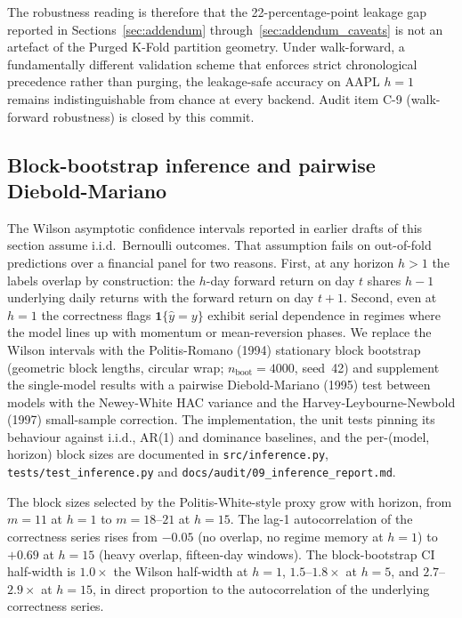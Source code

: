 \documentclass{rQUF2e}
\begin{document}
\noindent The robustness reading is therefore that the
22-percentage-point leakage gap reported in
Sections~\ref{sec:addendum} through~\ref{sec:addendum_caveats}
is not an artefact of the Purged K-Fold partition geometry.
Under walk-forward, a fundamentally different validation scheme
that enforces strict chronological precedence rather than
purging, the leakage-safe accuracy on AAPL $h=1$ remains
indistinguishable from chance at every backend. Audit item C-9
(walk-forward robustness) is closed by this commit.

\subsection{Block-bootstrap inference and pairwise Diebold-Mariano}
\label{sec:addendum_inference}

The Wilson asymptotic confidence intervals reported in earlier
drafts of this section assume i.i.d.\ Bernoulli outcomes. That
assumption fails on out-of-fold predictions over a financial
panel for two reasons. First, at any horizon $h>1$ the labels
overlap by construction: the $h$-day forward return on day $t$
shares $h-1$ underlying daily returns with the forward return on
day $t+1$. Second, even at $h=1$ the correctness flags
$\mathbf{1}\{\hat{y}=y\}$ exhibit serial dependence in regimes
where the model lines up with momentum or mean-reversion phases.
We replace the Wilson intervals with the Politis-Romano (1994)
stationary block bootstrap (geometric block lengths, circular
wrap; $n_{\text{boot}}=4000$, seed~42) and supplement the
single-model results with a pairwise Diebold-Mariano (1995) test
between models with the Newey-White HAC variance and the
Harvey-Leybourne-Newbold (1997) small-sample correction. The
implementation, the unit tests pinning its behaviour against
i.i.d., AR(1) and dominance baselines, and the per-(model,
horizon) block sizes are documented in
\texttt{src/inference.py}, \texttt{tests/test\_inference.py} and
\texttt{docs/audit/09\_inference\_report.md}.

The block sizes selected by the Politis-White-style proxy grow
with horizon, from $m=11$ at $h=1$ to $m=18$--$21$ at $h=15$.
The lag-1 autocorrelation of the correctness series rises from
$-0.05$ (no overlap, no regime memory at $h=1$) to $+0.69$ at
$h=15$ (heavy overlap, fifteen-day windows). The block-bootstrap
CI half-width is $1.0\times$ the Wilson half-width at $h=1$,
$1.5$--$1.8\times$ at $h=5$, and $2.7$--$2.9\times$ at $h=15$,
in direct proportion to the autocorrelation of the underlying
correctness series.
\end{document}

